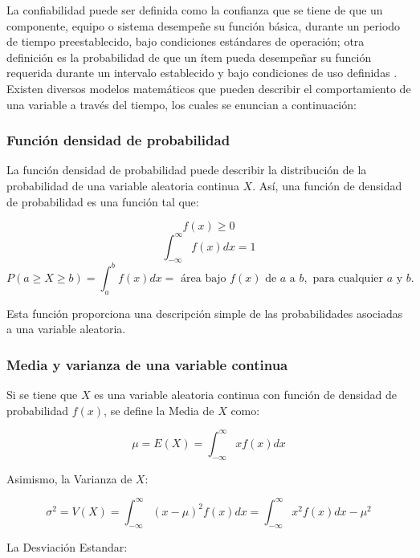 La confiabilidad puede ser definida como la confianza que se tiene de que un componente, equipo o sistema desempeñe su función básica, durante un periodo de tiempo preestablecido, bajo condiciones estándares de operación; otra definición es la probabilidad de que un ítem pueda desempeñar su función requerida durante un intervalo establecido y bajo condiciones de uso definidas \parencite{dairo2016}. Existen diversos modelos matemáticos que pueden describir el comportamiento de una variable a través del tiempo, los cuales se enuncian a continuación:

\subsubsection{Función densidad de probabilidad}

La función densidad de probabilidad puede describir la distribución de la probabilidad de una variable aleatoria continua $X$. Así, una función de densidad de probabilidad es una función tal que:


 $$f(x)\geqslant 0$$
 $$\int_{-\infty}^{\infty}f(x)dx=1$$
 \begin{equation*}
 P(a\geqslant X \geqslant b)=\int_{a}^{b}f(x)dx= \text{ área bajo } f(x) \text{ de } a \text{ a } b, \text{ para cualquier } a \text{ y } b.
 \end{equation*}



Esta función proporciona una descripción simple de las probabilidades asociadas a una variable aleatoria.

\subsubsection{Media y varianza de una variable continua}

Si se tiene que $X$ es una variable aleatoria continua con función de densidad de probabilidad $f(x)$, se define la Media de $X$ como:

\begin{equation}
\mu=E(X)=\int_{-\infty}^{\infty}xf(x)dx
\end{equation}

Asimismo, la Varianza de $X$:

\begin{equation}
\sigma^2=V(X)=\int_{-\infty}^{\infty}(x-\mu)^{2}f(x)dx=\int_{-\infty}^{\infty}x^{2}f(x)dx-\mu^2
\end{equation}

La Desviación Estandar:

